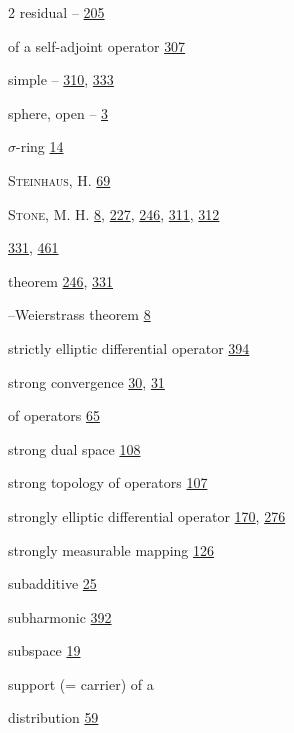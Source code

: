 \begin{multicols}{2}
\hspace*{1.1em}residual -- \hyperlink{page.205}{205}\par
\hspace*{1.1em}of a self-adjoint operator \hyperlink{page.307}{307}\par
\hspace*{1.1em}simple -- \hyperlink{page.310}{310}, \hyperlink{page.333}{333}\par
\noindent sphere, open -- \hyperlink{page.3}{3}\par
\noindent $ \sigma $-ring \hyperlink{page.14}{14}\par
\noindent \textsc{Steinhaus}, H. \hyperlink{page.69}{69}\par
\noindent \textsc{Stone}, M. H. \hyperlink{page.8}{8}, \hyperlink{page.227}{227}, \hyperlink{page.246}{246}, \hyperlink{page.311}{311}, \hyperlink{page.312}{312}\par
\noindent \hyperlink{page.331}{331}, \hyperlink{page.461}{461}\par
\hspace*{1.1em}theorem \hyperlink{page.246}{246}, \hyperlink{page.331}{331}\par
\hspace*{1.1em}--Weierstrass theorem \hyperlink{page.8}{8}\par
\noindent strictly elliptic differential operator \hyperlink{page.394}{394}\par
\noindent strong convergence \hyperlink{page.30}{30}, \hyperlink{page.31}{31}\par
\hspace*{1.1em}of operators \hyperlink{page.65}{65}\par
\noindent strong dual space \hyperlink{page.108}{108}\par
\noindent strong topology of operators \hyperlink{page.107}{107}\par
\noindent strongly elliptic differential operator \hyperlink{page.170}{170}, \hyperlink{page.276}{276}\par
\noindent strongly measurable mapping \hyperlink{page.126}{126}\par
\noindent subadditive \hyperlink{page.25}{25}\par
\noindent subharmonic \hyperlink{page.392}{392}\par
\noindent subspace \hyperlink{page.19}{19}\par
\noindent support (= carrier) of a\par
\hspace*{1.1em}distribution \hyperlink{page.59}{59}\par

\end{multicols}
